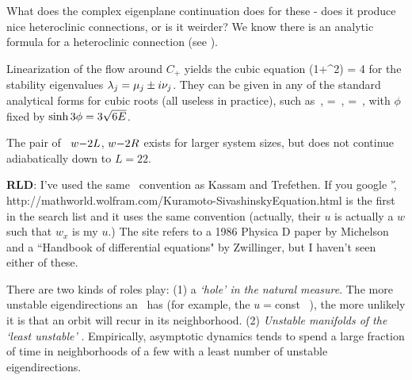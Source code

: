 {What does the complex eigenplane continuation does for these
{\eqva} - does it produce nice heteroclinic connections, or is it
weirder? We know there is an analytic formula for a heteroclinic
connection (see ). %

Linearization of the flow around $C_{+}$ yields the cubic equation
  \beq
\eigExp(1+\eigExp^2) = 4 \expctE
for the
stability eigenvalues
$\eigExp[j] = \eigRe[j] \pm i \eigIm[j]$.
They can
be given in any of the standard analytical forms for cubic
roots  (all useless in practice), such as
    \,,\qquad
\eigRe=\sinh \phi
\,,\qquad
\eigIm=\cosh \phi \, ,
with $\phi$ fixed by $\sinh 3\phi=3\sqrt{6\expctE}$.

The pair of \reqva\
${\nameit}2L$,
${\nameit}2R$
exists for larger system sizes, but does not continue
adiabatically down to $L=22$.



{\bf RLD}:
I've used the same \KSe\ convention as Kassam and Trefethen.
If you google '\KS\',
http://mathworld.wolfram.com/Kuramoto-SivashinskyEquation.html is
the first in the search list and it uses the same convention
(actually, their $u$ is actually a $w$ such that $w_x$ is my $u$.)
The site refers to a 1986 Physica D paper by Michelson and a
``Handbook of differential equations" by Zwillinger, but I haven't
seen either of these.

%
There are two kinds of roles
{\eqva} play:
(1)
a {\em `hole' in the natural measure}.
The more unstable eigendirections an \eqv\ has (for example, the
$u=$const \eqv~\EQV{0}), the more unlikely it is  that
an orbit will recur in its neighborhood.
(2)
{\em Unstable manifolds of the `least unstable' {\eqva}}.
Empirically, asymptotic dynamics tends to spend
a large fraction of time in
neighborhoods of a few  {\eqva} with
a least number of unstable eigendirections.




}
